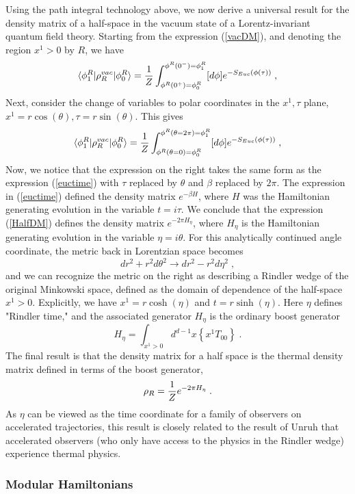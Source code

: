 \documentclass[12pt,epsf]{article}
\newcommand{\be}{\begin{equation}}
\newcommand{\ee}{\end{equation}}
\begin{document}
Using the path integral technology above, we now derive a universal result for the density matrix of a half-space in the vacuum state of a Lorentz-invariant quantum field theory. Starting from the expression (\ref{vacDM}), and denoting the region $x^1 > 0$ by $R$, we have
\be
\label{HalfDM}
\langle \phi^R_1 | \rho_R^{vac} | \phi^R_0 \rangle = {1 \over Z} \int_{ \phi^R(0^+) = \phi^R_0}^{\phi^R(0^-) = \phi^R_1} [d \phi] e^{- S_{Euc}(\phi(\tau))} \; ,
\ee
Next, consider the change of variables to polar coordinates in the $x^1,\tau$ plane,$x^1 = r \cos(\theta), \tau = r \sin(\theta)$. This gives
\be
\label{HalfDM2}
\langle \phi^R_1 | \rho_R^{vac} | \phi^R_0 \rangle = {1 \over Z} \int_{ \phi^R(\theta=0) = \phi^R_0}^{\phi^R(\theta = 2 \pi) = \phi^R_1} [d \phi] e^{- S_{Euc}(\phi(\tau))} \; ,
\ee
Now, we notice that the expression on the right takes the same form as the expression (\ref{euctime}) with $\tau$ replaced by $\theta$ and $\beta$ replaced by $2 \pi$. The expression in (\ref{euctime}) defined the density matrix $e^{-\beta H}$, where $H$ was the Hamiltonian generating evolution in the variable $t = i \tau$. We conclude that the expression (\ref{HalfDM}) defines the density matrix $e^{-2 \pi H_\eta}$, where $H_\eta$ is the Hamiltonian generating evolution in the variable $\eta = i \theta$. For this analytically continued angle coordinate, the metric back in Lorentzian space becomes
\be
dr^2 + r^2 d \theta^2 \to dr^2 - r^2 d \eta^2 \; ,
\ee
and we can recognize the metric on the right as describing a Rindler wedge of the original Minkowski space, defined as the domain of dependence of the half-space $x^1 > 0$. Explicitly, we have $x^1 = r \cosh(\eta)$ and $t = r \sinh(\eta)$. Here $\eta$ defines "Rindler time," and the associated generator $H_\eta$ is the ordinary boost generator
\be
\label{Heta}
H_\eta = \int_{x^1 > 0} d^{d-1} x \left\{x^1 T_{00}\right\} \; .
\ee
The final result is that the density matrix for a half space is the thermal density matrix defined in terms of the boost generator,
\be
\label{rhoRind}
\rho_R = {1 \over Z} e^{- 2 \pi H_\eta} \; .
\ee
As $\eta$ can be viewed as the time coordinate for a family of observers on accelerated trajectories, this result is closely related to the result of Unruh that accelerated observers (who only have access to the physics in the Rindler wedge) experience thermal physics.

\subsubsection*{Modular Hamiltonians}
\end{document}
